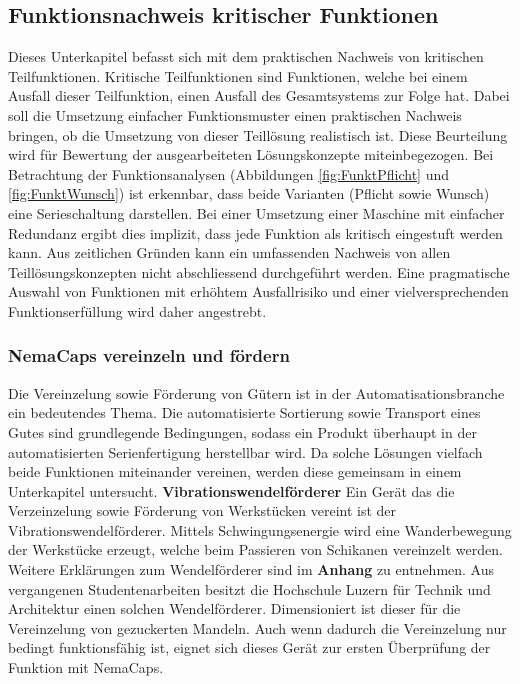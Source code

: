 \subsection{Funktionsnachweis kritischer Funktionen}
Dieses Unterkapitel befasst sich mit dem praktischen Nachweis von kritischen Teilfunktionen. Kritische Teilfunktionen sind Funktionen, welche bei einem Ausfall dieser Teilfunktion, einen Ausfall des Gesamtsystems zur Folge hat. Dabei soll die Umsetzung einfacher Funktionsmuster einen praktischen Nachweis bringen, ob die Umsetzung von dieser Teillösung realistisch ist. Diese Beurteilung wird für Bewertung der ausgearbeiteten Lösungskonzepte miteinbegezogen.
\newline
Bei Betrachtung der Funktionsanalysen (Abbildungen \ref{fig:FunktPflicht} und \ref{fig:FunktWunsch}) ist erkennbar, dass beide Varianten (Pflicht sowie Wunsch) eine Serieschaltung darstellen. Bei einer Umsetzung einer Maschine mit einfacher Redundanz ergibt dies implizit, dass jede Funktion als kritisch eingestuft werden kann. Aus zeitlichen Gründen kann ein umfassenden Nachweis von allen Teillösungskonzepten nicht abschliessend durchgeführt werden. Eine pragmatische Auswahl von Funktionen mit erhöhtem Ausfallrisiko und einer vielversprechenden Funktionserfüllung wird daher angestrebt.

\subsubsection{NemaCaps vereinzeln und fördern}
Die Vereinzelung sowie Förderung von Gütern ist in der Automatisationsbranche ein bedeutendes Thema. Die automatisierte Sortierung sowie Transport eines Gutes sind grundlegende Bedingungen, sodass ein Produkt überhaupt in der automatisierten Serienfertigung herstellbar wird. Da solche Lösungen vielfach beide Funktionen miteinander vereinen, werden diese gemeinsam in einem Unterkapitel untersucht.
\newline
\newline
\textbf{Vibrationswendelförderer}
\newline
Ein Gerät das die Verzeinzelung sowie Förderung von Werkstücken vereint ist der Vibrationswendelförderer. Mittels Schwingungsenergie wird eine Wanderbewegung der Werkstücke erzeugt, welche beim Passieren von Schikanen vereinzelt werden. Weitere Erklärungen zum Wendelförderer sind im \textbf{Anhang} zu entnehmen.
\newline
Aus vergangenen Studentenarbeiten besitzt die Hochschule Luzern für Technik und Architektur einen solchen Wendelförderer. Dimensioniert ist dieser für die Vereinzelung von gezuckerten Mandeln. Auch wenn dadurch die Vereinzelung nur bedingt funktionsfähig ist, eignet sich dieses Gerät zur ersten Überprüfung der Funktion mit NemaCaps. 

